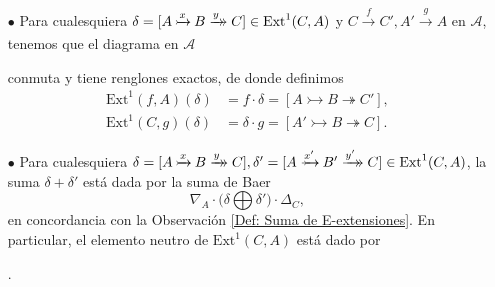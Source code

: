 \documentclass[tesis]{subfiles}
\begin{document}
\begin{Ejem}
\begin{itemize}
        \item[$\bullet$] Para cualesquiera $\delta = [A\xrightarrow[]{x}\mathrel{\mkern-21mu}\rightarrowtail B\xrightarrow[]{y}\mathrel{\mkern-14mu}\rightarrow C]\in\text{Ext}^1(C,A)$ y $C\xrightarrow[]{f}C', A'\xrightarrow[]{g}A$ en $\mathscr{A}$, tenemos que el diagrama en $\mathscr{A}$
            \begin{center}
            \end{center}
            conmuta y tiene renglones exactos, de donde definimos
            \begin{align*}
                \text{Ext}^{1}(f,A)(\delta) &= f\cdot\delta = [A\rightarrowtail B\twoheadrightarrow C'], \\
                \text{Ext}^{1}(C,g)(\delta) &= \delta\cdot g = [A'\rightarrowtail B\twoheadrightarrow C].
            \end{align*}

        \item[$\bullet$] Para cualesquiera $\delta = [A\xrightarrowtail{x} B\xtwoheadrightarrow{y} C], \delta' = [A\xrightarrowtail{x'} B'\xtwoheadrightarrow{y'} C]\in\text{Ext}^{1}(C,A)$, la suma $\delta+\delta'$ está dada por la suma de Baer
            \[
                \nabla_A\cdot\big(\delta\bigoplus\delta')\cdot\Delta_C,
            \] 
                en concordancia con la Observación \ref{Def: Suma de E-extensiones}. En particular, el elemento neutro de $\text{Ext}^{1}(C,A)$ está dado por . %
    \end{itemize}


\end{Ejem}
\end{document}
